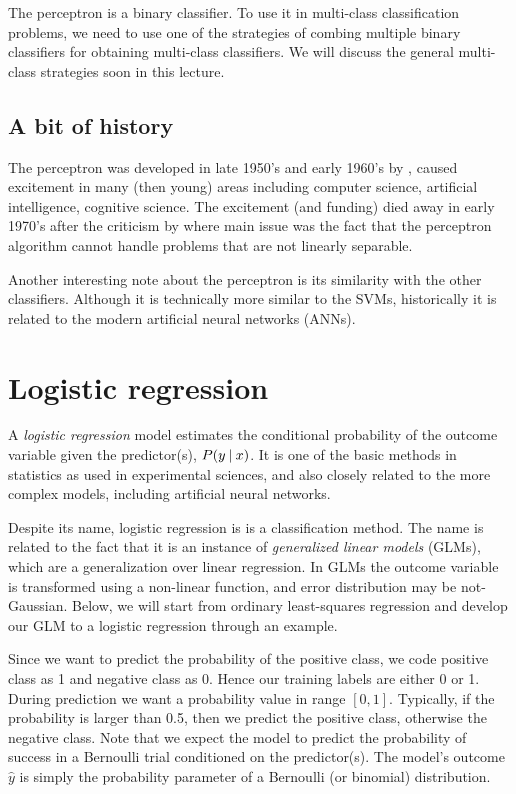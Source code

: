 The perceptron is a binary classifier.
To use it in multi-class classification problems,
we need to use one of the strategies of combing multiple binary classifiers
for obtaining multi-class classifiers.
We will discuss the general multi-class strategies soon in this lecture.

\subsection{A bit of history}

The perceptron was developed in late 1950’s and early 1960’s by 
\textcite{rosenblatt1958},
caused excitement in many (then young) areas including
computer science, artificial intelligence, cognitive science.
The excitement (and funding) died away in early 1970’s after the criticism by
\textcite{minsky1969} where main issue was the fact that
the perceptron algorithm cannot handle problems that are not linearly separable.

Another interesting note about the perceptron is
its similarity with the other classifiers.
Although it is technically more similar to the SVMs,
historically it is related to the modern artificial neural networks (ANNs).

\section{Logistic regression}

A  \emph{logistic regression} model estimates
the conditional probability of the outcome variable given the predictor(s),
$P(y\:\vert\:{}x)$.
It is one of the basic methods in statistics as used in experimental sciences,
and also closely related to the more complex models,
including artificial neural networks.

Despite its name, logistic regression is is a classification method.
The name is related to the fact that it is an instance
of \emph{generalized linear models} (GLMs),
which are a generalization over linear regression.
In GLMs the outcome variable is transformed using a non-linear function,%
and error distribution may be not-Gaussian.
Below, we will start from ordinary least-squares regression
and develop our GLM to a logistic regression through an example.

Since we want to predict the probability of the positive class,
we code positive class as \num{1} and negative class as \num{0}.%
Hence our training labels are either \num{0} or \num{1}.
During prediction we want a probability value in range $[0, 1]$.
Typically, if the probability is larger than \num{0.5},
then we predict the positive class,
otherwise the negative class.
Note that we expect the model to predict the probability of success
in a Bernoulli trial conditioned on the predictor(s).
The model's outcome $\hat{y}$ is simply the probability parameter
of a Bernoulli (or binomial) distribution.

